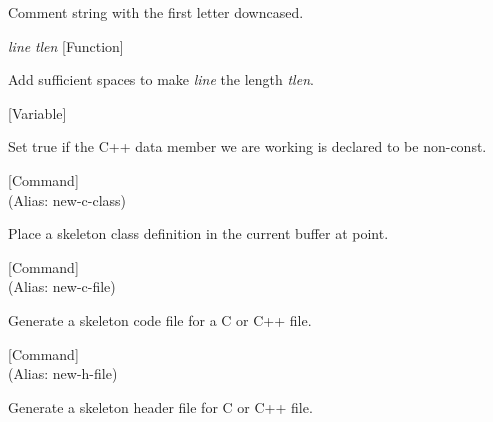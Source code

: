 \begin{doc-string}
Comment string with the first letter downcased.
\end{doc-string}

\vspace{1em}
\noindent
{}
\usebox{\funcname}\emph{line} \emph{tlen}
 \hfill [Function]

\begin{doc-string}
Add sufficient spaces to make \emph{line} the length \emph{tlen}.
\end{doc-string}

\vspace{1em}
\noindent
{}
\usebox{\funcname}
 \hfill [Variable]

\begin{doc-string}
Set true if the C++ data member we are working is declared to be non-const.
\end{doc-string}

\vspace{1em}
\noindent
{}
\usebox{\funcname}
 \hfill [Command]\\%
 (Alias: new-c-class)

\begin{doc-string}
Place a skeleton class definition in the current buffer at point.
\end{doc-string}

\vspace{1em}
\noindent
{}
\usebox{\funcname}
 \hfill [Command]\\%
 (Alias: new-c-file)

\begin{doc-string}
Generate a skeleton code file for a C or C++ file.
\end{doc-string}

\vspace{1em}
\noindent
{}
\usebox{\funcname}
 \hfill [Command]\\%
 (Alias: new-h-file)

\begin{doc-string}
Generate a skeleton header file for C or C++ file.
\end{doc-string}

